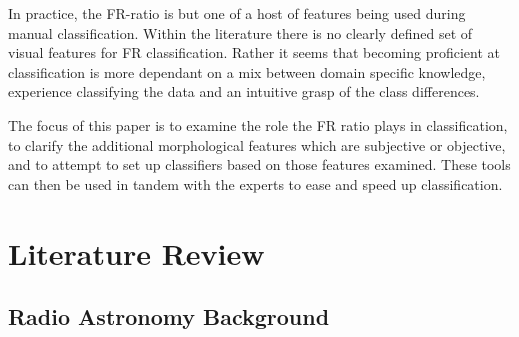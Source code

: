 \documentclass[conference]{IEEEtran}
\begin{document}
In practice, the FR-ratio is but one of a host of features being used during manual classification. Within the literature there is no 
clearly defined set of visual features for FR classification. Rather it seems that
becoming proficient at classification is more dependant on a mix between domain 
specific knowledge, experience classifying the data and an intuitive grasp of the class differences. 

The focus of this paper is to examine the role the FR ratio plays in 
classification, to clarify the additional morphological features which are subjective or objective, and to attempt to set up classifiers based on those features examined. 
These tools can then be used in tandem with the experts to ease and speed up classification.



\section{Literature Review}

\subsection{Radio Astronomy Background}
\end{document}
